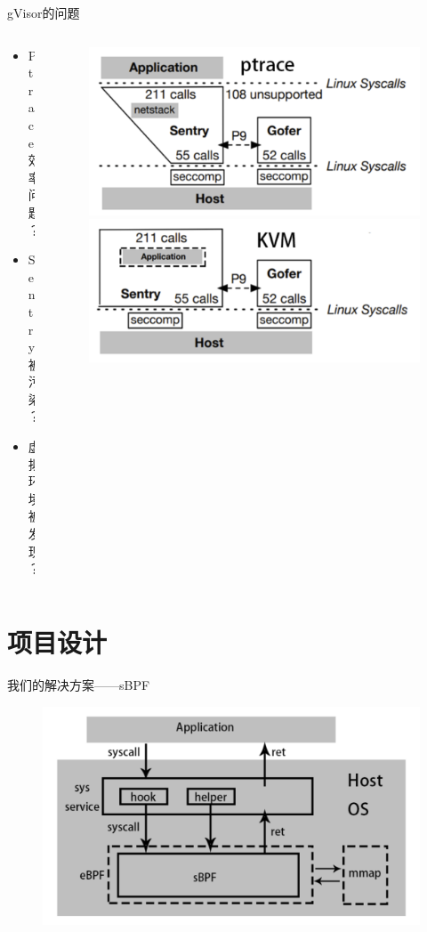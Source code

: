 \documentclass[UTF8,fontset=macnew,xcolor=table]{ctexbeamer}
\begin{document}
\begin{frame}{gVisor的问题}
    \begin{columns}
        \begin{column}{0.5\textwidth}
            \begin{itemize}
                \item Ptrace效率问题？
                \item Sentry被污染？
                \item 虚拟环境被发现？
            \end{itemize}
        \end{column}

        \begin{column}{0.5\textwidth}
            \begin{figure}[H]
                \centering
                \includegraphics[width=0.8\columnwidth]{pic2.png}
                \includegraphics[width=0.8\columnwidth]{pic3.png}
            \end{figure}
        \end{column}
    \end{columns}
\end{frame}

\section{项目设计}

\begin{frame}{我们的解决方案——sBPF}
    \begin{figure}[H]
        \centering
        \includegraphics[width=0.68\columnwidth]{pic4.png}
    \end{figure}
\end{frame}
\end{document}
